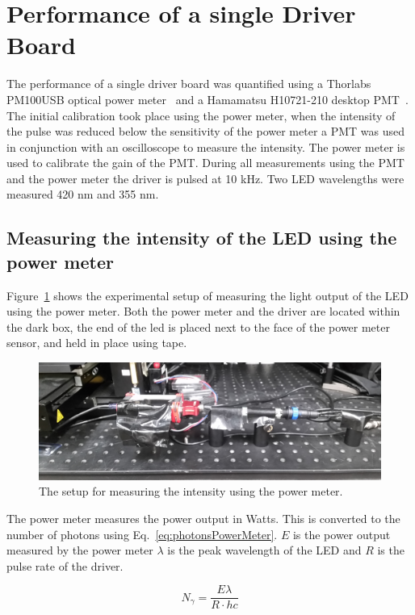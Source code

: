\documentclass[11pt, a4paper, oneside ]{article}
\begin{document}
\section{Performance of a single Driver Board}

The performance of a single driver board was quantified using a Thorlabs PM100USB optical power meter~\cite{PowermeterDataSheet} and a Hamamatsu H10721-210 desktop PMT~\cite{PMTDataSheet}. The initial calibration took place using the power meter, when the intensity of the pulse was reduced below the sensitivity of the power meter a PMT was used in conjunction with an oscilloscope to measure the intensity. The power meter is used to calibrate the gain of the PMT. During all measurements using the PMT and the power meter the driver is pulsed at 10 kHz. Two LED wavelengths were measured 420 nm and 355 nm.

\subsection{Measuring the intensity of the LED using the power meter}
Figure~\ref{fig:powerMeterSetup} shows the experimental setup of measuring the light output of the LED using the power meter. Both the power meter and the driver are located within the dark box, the end of the led is placed next to the face of the power meter sensor, and held in place using tape. 

\begin{figure}[H]
    \centering
    \includegraphics[width=\textwidth]{figures/PowerMeterSetup.jpg}
    \caption{The setup for measuring the intensity using the power meter.}
    \label{fig:powerMeterSetup}
\end{figure}

The power meter measures the power output in Watts. This is converted to the number of photons using Eq.~\ref{eq:photonsPowerMeter}. $E$ is the power output measured by the power meter $\lambda$ is the peak wavelength of the LED and $R$ is the pulse rate of the driver.

\begin{equation}
    N_\gamma = \frac{E \lambda}{R \cdot hc}
    \label{eq:photonsPowerMeter}
\end{equation}
\end{document}
